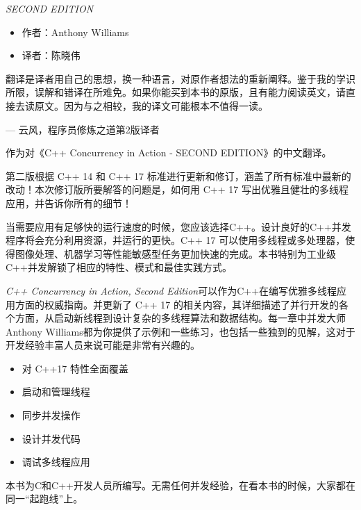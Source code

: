 \textit{SECOND EDITION}
\begin{itemize}
    \item 作者：Anthony Williams
    \item 译者：陈晓伟
\end{itemize}

翻译是译者用自己的思想，换一种语言，对原作者想法的重新阐释。鉴于我的学识所限，误解和错译在所难免。如果你能买到本书的原版，且有能力阅读英文，请直接去读原文。因为与之相较，我的译文可能根本不值得一读。

\hfill — 云风，程序员修炼之道第2版译者


作为对《C++ Concurrency in Action - SECOND EDITION》的中文翻译。

第二版根据 C++ 14 和 C++ 17 标准进行更新和修订，涵盖了所有标准中最新的改动！本次修订版所要解答的问题是，如何用 C++ 17 写出优雅且健壮的多线程应用，并告诉你所有的细节！


当需要应用有足够快的运行速度的时候，您应该选择C++。设计良好的C++并发程序将会充分利用资源，并运行的更快。C++ 17 可以使用多线程或多处理器，使得图像处理、机器学习等性能敏感型任务更加快速的完成。本书特别为工业级C++并发解锁了相应的特性、模式和最佳实践方式。


\textit{C++ Concurrency in Action, Second Edition}可以作为C++在编写优雅多线程应用方面的权威指南。并更新了 C++ 17 的相关内容，其详细描述了并行开发的各个方面，从启动新线程到设计复杂的多线程算法和数据结构。每一章中并发大师Anthony Williams都为你提供了示例和一些练习，也包括一些独到的见解，这对于开发经验丰富人员来说可能是非常有兴趣的。


\begin{itemize}
    \item 对 C++17 特性全面覆盖
    \item 启动和管理线程
    \item 同步并发操作
    \item 设计并发代码
    \item 调试多线程应用
\end{itemize}


本书为C和C++开发人员所编写。无需任何并发经验，在看本书的时候，大家都在同一“起跑线”上。

